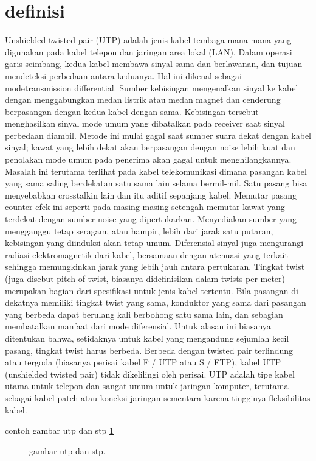 \section{definisi}
Unshielded twisted pair (UTP) adalah jenis kabel tembaga mana-mana yang digunakan pada kabel telepon dan jaringan area lokal (LAN).
Dalam operasi garis seimbang, kedua kabel membawa sinyal sama dan berlawanan, dan tujuan mendeteksi perbedaan antara keduanya. Hal 
ini dikenal sebagai modetransmission differential. Sumber kebisingan mengenalkan sinyal ke kabel dengan menggabungkan medan listrik 
atau medan magnet dan cenderung berpasangan dengan kedua kabel dengan sama. Kebisingan tersebut menghasilkan sinyal mode umum yang 
dibatalkan pada receiver saat sinyal perbedaan diambil. Metode ini mulai gagal saat sumber suara dekat dengan kabel sinyal; kawat 
yang lebih dekat akan berpasangan dengan noise lebih kuat dan penolakan mode umum pada penerima akan gagal untuk menghilangkannya. 
Masalah ini terutama terlihat pada kabel telekomunikasi dimana pasangan kabel yang sama saling berdekatan satu sama lain selama 
bermil-mil. Satu pasang bisa menyebabkan crosstalkin lain dan itu aditif sepanjang kabel. Memutar pasang counter efek ini seperti 
pada masing-masing setengah memutar kawat yang terdekat dengan sumber noise yang dipertukarkan. Menyediakan sumber yang mengganggu 
tetap seragam, atau hampir, lebih dari jarak satu putaran, kebisingan yang diinduksi akan tetap umum. Diferensial sinyal juga mengurangi 
radiasi elektromagnetik dari kabel, bersamaan dengan atenuasi yang terkait sehingga memungkinkan jarak yang lebih jauh antara pertukaran. 
Tingkat twist (juga disebut pitch of twist, biasanya didefinisikan dalam twists per meter) merupakan bagian dari spesifikasi untuk jenis 
kabel tertentu. Bila pasangan di dekatnya memiliki tingkat twist yang sama, konduktor yang sama dari pasangan yang berbeda dapat berulang 
kali berbohong satu sama lain, dan sebagian membatalkan manfaat dari mode diferensial. Untuk alasan ini biasanya ditentukan bahwa, setidaknya 
untuk kabel yang mengandung sejumlah kecil pasang, tingkat twist harus berbeda. Berbeda dengan twisted pair terlindung atau tergoda (biasanya 
perisai kabel F / UTP atau S / FTP), kabel UTP (unshielded twisted pair) tidak dikelilingi oleh perisai. UTP adalah tipe kabel utama untuk 
telepon dan sangat umum untuk jaringan komputer, terutama sebagai kabel patch atau koneksi jaringan sementara karena tingginya fleksibilitas kabel.

	contoh gambar utp dan stp \ref{utp_stp}
	\begin{figure}[ht]
		\centerline{}
		\caption{gambar utp dan stp.}
		\label{utp_stp}
	\end{figure}

